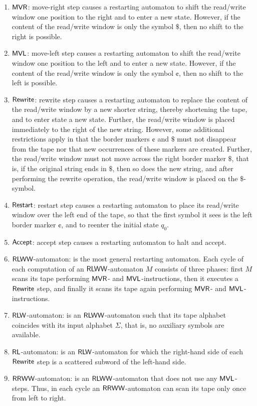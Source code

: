 \begin{enumerate}[]
\item $\textup{\sf MVR}$: move-right step causes a restarting automaton to shift the read/write window one position to the right and to enter a new state. However, if the content of the read/write window is only the symbol $\$$, then no shift to the right is possible.
\item $\textup{\sf MVL}$: move-left step causes a restarting automaton to shift the read/write window one position to the left and to enter a new state. However, if the content of the read/write window is only the symbol $\cent$, then no shift to the left is possible.
\item $\textup{\sf Rewrite}$: rewrite step causes a restarting automaton to replace the content of the read/write window by a new shorter string, thereby shortening the tape, and to enter state a new state. Further, the read/write window is placed immediately to the right of the new string. However, some additional restrictions apply in that the border markers $\cent$ and $\$$ must not disappear from the tape nor that new occurrences of these markers are created. Further, the read/write window must not move across the right border marker $\$$, that is, if the original string ends in $\$$, then so does the new string, and after performing the rewrite operation, the read/write window is placed on the $\$$-symbol.
\item $\textup{\sf Restart}$: restart step causes a restarting automaton to place its read/write window over the left end of the tape, so that the first symbol it sees is the left border marker $\cent$, and to reenter the initial state $q_0$.
\item $\textup{\sf Accept}$: accept step causes a restarting automaton to halt and accept.
\item $\textup{\sf RLWW}$-automaton: is the most general restarting automaton. Each cycle of each computation of an $\textup{\sf RLWW}$-automaton $M$ consists of three phases: first $M$ scans its tape performing $\textup{\sf MVR}$- and $\textup{\sf MVL}$-instructions, then it executes a $\textup{\sf Rewrite}$ step, and finally it scans its tape again performing $\textup{\sf MVR}$- and $\textup{\sf MVL}$-instructions.
\item $\textup{\sf RLW}$-automaton: is an $\textup{\sf RLWW}$-automaton such that its tape alphabet coincides with its input alphabet $\Sigma$, that is, no auxiliary symbols are available.
\item $\textup{\sf RL}$-automaton: is an $\textup{\sf RLW}$-automaton for which the right-hand side of each $\textup{\sf Rewrite}$ step is a scattered subword of the left-hand side.
\item $\textup{\sf RRWW}$-automaton: is an $\textup{\sf RLWW}$-automaton that does not use any $\textup{\sf MVL}$-steps. Thus, in each cycle an $\textup{\sf RRWW}$-automaton can scan its tape only once from left to right.

\end{enumerate}
